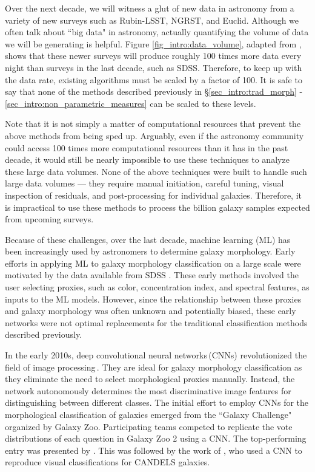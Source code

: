 Over the next decade, we will witness a glut of new data in astronomy from a variety of new surveys such as Rubin-LSST, NGRST, and Euclid. Although we often talk about ``big data" in astronomy, actually quantifying the volume of data we will be generating is helpful. Figure \ref{fig_intro:data_volume}, adapted from \citet{kremer_17}, shows that these newer surveys will produce roughly 100 times more data every night than surveys in the last decade, such as SDSS. Therefore, to keep up with the data rate, existing algorithms must be scaled by a factor of 100. It is safe to say that none of the methods described previously in \S \ref{sec_intro:trad_morph} - \ref{sec_intro:non_parametric_measures} can be scaled to these levels. 

Note that it is not simply a matter of computational resources that prevent the above methods from being sped up. Arguably, even if the astronomy community could access 100 times more computational resources than it has in the past decade, it would still be nearly impossible to use these techniques to analyze these large data volumes. None of the above techniques were built to handle such large data volumes --- they require manual initiation, careful tuning, visual inspection of residuals, and post-processing for individual galaxies. Therefore, it is impractical to use these methods to process the billion galaxy samples expected from upcoming surveys.

Because of these challenges, over the last decade, machine learning (ML) has been increasingly used by astronomers to determine galaxy morphology. Early efforts in applying ML to galaxy morphology classification on a large scale were motivated by the data available from SDSS \citep[e.g.,][]{Ball2004GalaxyNetworks,Kelly2004MorphologicalSurvey,banerji_10}. These early methods involved the user selecting proxies, such as color, concentration index, and spectral features, as inputs to the ML models. However, since the relationship between these proxies and galaxy morphology was often unknown and potentially biased, these early networks were not optimal replacements for the traditional classification methods described previously. 

In the early 2010s, deep  convolutional neural networks\,(CNNs) revolutionized the field of image processing\,\citep[see][for an overview]{dl_1}. They are ideal for galaxy morphology classification as they eliminate the need to select morphological proxies manually. Instead, the network autonomously determines the most discriminative image features for distinguishing between different classes. The initial effort to employ CNNs for the morphological classification of galaxies emerged from the ``Galaxy Challenge" organized by Galaxy Zoo. Participating teams competed to replicate the vote distributions of each question in Galaxy Zoo 2 using a CNN. The top-performing entry was presented by \citealp{Dieleman2015Rotation-invariantPrediction}. This was followed by the work of \citet{Huertas-Company2015ALEARNING}, who used a CNN to reproduce visual classifications for CANDELS galaxies.

